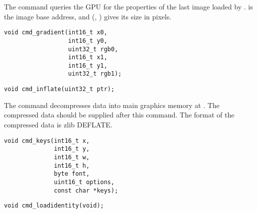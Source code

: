 The  command
queries the GPU for the properties of the last image loaded by
.
 is the image base address, and (, ) gives its size in pixels.



\begin{framed}
\begin{verbatim}
void cmd_gradient(int16_t x0,
                  int16_t y0,
                  uint32_t rgb0,
                  int16_t x1,
                  int16_t y1,
                  uint32_t rgb1);
\end{verbatim}
\end{framed}




\begin{framed}
\begin{verbatim}
void cmd_inflate(uint32_t ptr);
\end{verbatim}
\end{framed}

The  command
decompresses data into main graphics memory at .
The compressed data should be supplied
after this command.
The format of the compressed data is zlib DEFLATE.


\begin{framed}
\begin{verbatim}
void cmd_keys(int16_t x,
              int16_t y,
              int16_t w,
              int16_t h,
              byte font,
              uint16_t options,
              const char *keys);
\end{verbatim}
\end{framed}



\begin{framed}
\begin{verbatim}
void cmd_loadidentity(void);
\end{verbatim}
\end{framed}

